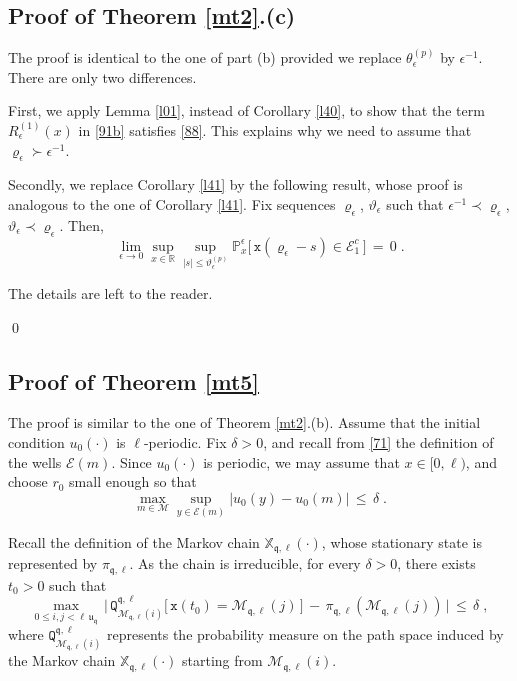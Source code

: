 \documentclass[reqno]{amsart}
\theoremstyle{plain}
\theoremstyle{definition}
\newcommand{\mc}[1]{{\mathcal #1}}
\newcommand{\mf}[1]{{\mathfrak #1}}
\newcommand{\bb}[1]{{\mathbb #1}}
\newcommand{\ms}[1]{{\mathscr #1}}
\newcommand{\mtt}[1]{{\mathtt #1}}
\newcounter{as}[section]
\newcommand{\<}{\langle}
\renewcommand{\>}{\rangle}
\begin{document}
\subsection*{Proof of Theorem \ref{mt2}.(c)}

The proof is identical to the one of part (b) provided we replace
$\theta^{(p)}_\epsilon$ by $\epsilon^{-1}$. There are only two
differences.

First, we apply Lemma \ref{l01}, instead of Corollary \ref{l40}, to
show that the term $R^{(1)}_\epsilon(x)$ in \eqref{91b} satisfies
\eqref{88}. This explains why we need to assume that
$\varrho_\epsilon \succ \epsilon^{-1}$.

Secondly, we replace Corollary \ref{l41} by the following result,
whose proof is analogous to the one of Corollary \ref{l41}. 
Fix  sequences $\varrho_\epsilon$,
$\vartheta_\epsilon$ such that
$\epsilon^{-1} \prec \varrho_\epsilon$,
$\vartheta_\epsilon\prec \varrho_\epsilon$.  Then,
\begin{equation*}
\lim_{\epsilon\to 0} \sup_{x\in \bb R}
\sup_{|s| \le \vartheta^{(p)}_\epsilon}
\bb P^{\epsilon}_x\big[ \, 
\mtt x(\varrho_\epsilon - s) \in \ms E_1^c \,\big] \,=\, 0 \;.
\end{equation*}

The details are left to the reader.

\qed

\subsection*{Proof of Theorem \ref{mt5}}

The proof is similar to the one of Theorem \ref{mt2}.(b).
Assume that the initial condition $u_0(\cdot)$ is $\ell$-periodic.
Fix $\delta>0$, and recall from \eqref{71} the definition of the wells
$\ms E(m)$. Since $u_0(\cdot)$ is periodic, we may assume that
$x\in [0, \ell)$, and choose $r_0$ small enough so that
\begin{equation}
\label{103}
\max_{m\in \mc M} \sup_{y\in\ms E(m)} |u_0(y) -
u_0(m)| \,\le\, \delta \;.
\end{equation}

Recall the definition of the Markov chain
$\bb X_{\mf q, \ell} (\cdot)$, whose stationary state is
represented by $\pi_{\mf q, \ell}$. As the chain is
irreducible, for every $\delta>0$, there exists $t_0>0$ such that
\begin{equation*}
\max_{0 \le i, j < \ell\, \mf u_{\mf q}}\,
\Big|\, \mtt Q^{\mf q, \ell}_{\ms M_{\mf q, \ell} (i)}
\big[ \, \mtt x(t_0) = \ms M_{\mf q, \ell} (j)\, \big]
\,-\, \pi_{\mf q, \ell} (\ms M_{\mf q, \ell} (j)) \,
\Big|\,\le\,\delta \;,
\end{equation*}
where $\mtt Q^{\mf q, \ell}_{\ms M_{\mf q, \ell} (i)}$
represents the probability measure on the path space induced by the
Markov chain $\bb X_{\mf q, \ell} (\cdot)$ starting
from $\ms M_{\mf q, \ell} (i)$.
\end{document}
